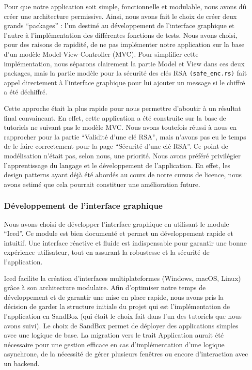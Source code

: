 \documentclass[12pt]{article} %
\begin{document}
	Pour que notre application soit simple, fonctionnelle et modulable, nous avons dû créer une architecture permissive. Ainsi, nous avons fait le choix de créer deux grands “packages” : l’un destiné au développement de l'interface graphique et l'autre à l'implémentation des différentes fonctions de tests. Nous avons choisi, pour des raisons de rapidité, de ne pas implémenter notre application sur la base d'un modèle Model-View-Controller (MVC). Pour simplifier cette implémentation, nous séparons clairement la partie Model et View dans ces deux packages, mais la partie modèle pour la sécurité des clés RSA \texttt{(safe\_enc.rs)} fait appel directement à l'interface graphique pour lui ajouter un message si le chiffré a été déchiffré.
	
Cette approche était la plus rapide pour nous permettre d’aboutir à un résultat final convaincant. En effet, cette application a été construite sur la base de tutoriels ne suivant pas le modèle MVC. Nous avons toutefois réussi à nous en rapprocher pour la partie “Validité d’une clé RSA”, mais n’avons pas eu le temps de le faire correctement pour la page “Sécurité d’une clé RSA”. Ce point de modélisation n’était pas, selon nous, une priorité. Nous avons préféré privilégier l’apprentissage du langage et le développement de l’application. En effet, les design patterns ayant déjà été abordés au cours de notre cursus de licence, nous avons estimé que cela pourrait constituer une amélioration future.

		\subsubsection{Développement de l’interface graphique}
		Nous avons choisi de développer l'interface graphique en utilisant le module “Iced”. Ce module est bien documenté et permet un développement rapide et intuitif. Une interface réactive et fluide est indispensable pour garantir une bonne expérience utilisateur, tout en assurant la robustesse et la sécurité de l'application.
		
Iced facilite la création d'interfaces multiplateformes (Windows, macOS, Linux) grâce à son architecture modulaire. Afin d’optimiser notre temps de développement et de garantir une mise en place rapide, nous avons pris la décision de garder la structure initiale du projet qui est l’implémentation de l’application en SandBox (qui était le choix fait dans l’un des tutoriels que nous avons suivi). Le choix de SandBox permet de déployer des applications simples avec une logique de base. La migration vers le trait Application aurait été nécessaire pour une gestion efficace en cas d’implémentation d’une logique asynchrone, de la nécessité de gérer plusieurs fenêtres ou encore d’interaction avec un backend.
\end{document}
